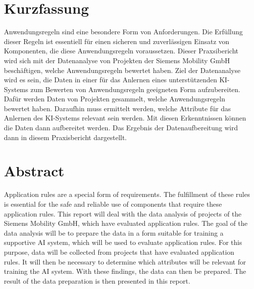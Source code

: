 \section*{Kurzfassung}
Anwendungsregeln sind eine besondere Form von Anforderungen. Die Erfüllung dieser Regeln ist essentiell für einen sicheren und zuverlässigen Einsatz von Komponenten, die diese Anwendungsregeln
voraussetzen. Dieser Praxsibericht wird sich mit der Datenanalyse von Projekten der Siemens Mobility GmbH beschäftigen, welche Anwendungsregeln bewertet haben. Ziel der Datenanalyse wird es sein,
die Daten in einer für das Anlernen eines unterstützenden KI-Systems zum Bewerten von Anwendungsregeln geeigneten Form aufzubereiten. Dafür werden Daten von Projekten gesammelt, welche Anwendungsregeln
bewertet haben. Daraufhin muss ermittelt werden, welche Attribute für das Anlernen des KI-Systems relevant sein werden. Mit diesen Erkenntnissen können die Daten dann aufbereitet werden. Das Ergebnis
der Datenaufbereitung wird dann in diesem Praxisbericht dargestellt.

\vfill\vfill\vfill\vfill\vfill\vfill
\section*{Abstract}
Application rules are a special form of requirements. The fulfillment of these rules is essential for the safe and reliable use of components that require these application rules.
This report will deal with the data analysis of projects of the Siemens Mobility GmbH, which have evaluated application rules. The goal of the data analysis will be to
prepare the data in a form suitable for training a supportive AI system, which will be used to evaluate application rules. For this purpose, data will be collected from projects 
that have evaluated application rules. It will then be necessary to determine which attributes will be relevant for training the AI system. With these findings, 
the data can then be prepared. The result of the data preparation is then presented in this report.
\vfill\vfill\vfill\vfill\vfill\vfill
